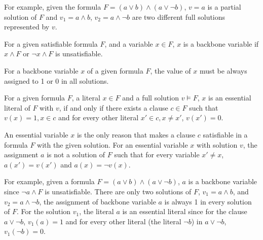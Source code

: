 For example, given the formula $F=(a\vee b)\wedge(a\vee \neg b)$, $v=a$ is a partial solution of $F$ and $v_1=a\wedge b$, $v_2=a\wedge \neg b$ are two different full solutions represented by $v$.


\begin{definition}
For a given satisfiable formula $F$, and a variable $x\in F$, $x$ is a backbone variable if $x\wedge F$ or $\neg x \wedge F$ is unsatisfiable.
\end{definition}

\begin{lemma}
For a backbone variable $x$ of a given formula $F$, the value of $x$ must be always assigned to 1 or 0 in all solutions.
\end{lemma}

\begin{definition}
For a given formula $F$, a literal $x\in F$ and a full solution $v\models F$, $x$ is an essential literal of $F$ with $v$, if and only if there exists a clause $c\in F$ such that $v(x)=1, x\in c$ and for every other literal $x'\in c, x\neq x'$, $v(x')=0$. 
\end{definition}

An essential variable $x$ is the only reason that makes a clause $c$ satisfiable in a formula $F$ with the given solution. For an essential variable $x$ with solution $v$, the assignment $a$ is not a solution of $F$ such that for every variable $x' \neq x $, $a(x')=v(x')$ and $a(x)=\neg v(x)$.

For example, given a formula $F=(a\vee b)\wedge(a \vee \neg b)$, $a$ is a backbone variable since $\neg a \wedge F$ is unsatisfiable.
There are only two solutions of $F$, $v_1=a\wedge b$, and $v_2=a\wedge \neg b$, the assignment of backbone variable $a$ is always 1 in every solution of $F$. 
For the solution $v_1$, the literal $a$ is an essential literal since for the clause $a\vee \neg b$, $v_1(a)=1$ and for every other literal (the literal $\neg b$) in $a\vee \neg b$, $v_1(\neg b)=0$.
